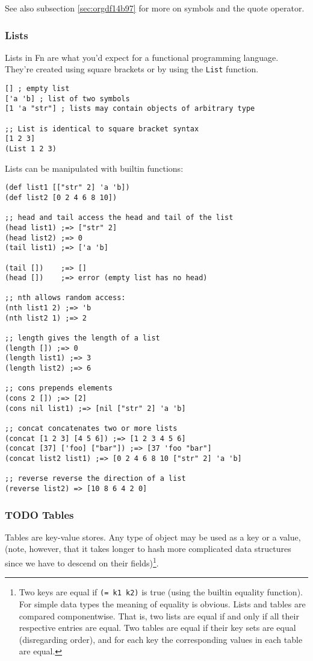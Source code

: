 \documentclass[11pt]{article}
\begin{document}
See also subsection \ref{sec:orgdf14b97} for more on symbols and the quote operator.


\subsubsection{Lists}
\label{sec:orga48c356}

Lists in Fn are what you'd expect for a functional programming language. They're
created using square brackets or by using the \texttt{List} function.

\begin{verbatim}
[] ; empty list
['a 'b] ; list of two symbols
[1 'a "str"] ; lists may contain objects of arbitrary type

;; List is identical to square bracket syntax
[1 2 3]
(List 1 2 3)
\end{verbatim}

Lists can be manipulated with builtin functions:

\begin{verbatim}
(def list1 [["str" 2] 'a 'b])
(def list2 [0 2 4 6 8 10])

;; head and tail access the head and tail of the list
(head list1) ;=> ["str" 2]
(head list2) ;=> 0
(tail list1) ;=> ['a 'b]

(tail [])    ;=> []
(head [])    ;=> error (empty list has no head)

;; nth allows random access:
(nth list1 2) ;=> 'b
(nth list2 1) ;=> 2

;; length gives the length of a list
(length []) ;=> 0
(length list1) ;=> 3
(length list2) ;=> 6

;; cons prepends elements
(cons 2 []) ;=> [2]
(cons nil list1) ;=> [nil ["str" 2] 'a 'b]

;; concat concatenates two or more lists
(concat [1 2 3] [4 5 6]) ;=> [1 2 3 4 5 6]
(concat [37] ['foo] ["bar"]) ;=> [37 'foo "bar"]
(concat list2 list1) ;=> [0 2 4 6 8 10 ["str" 2] 'a 'b]

;; reverse reverse the direction of a list
(reverse list2) => [10 8 6 4 2 0]
\end{verbatim}


\subsubsection{{\bfseries\sffamily TODO} Tables}
\label{sec:org4014214}

Tables are key-value stores. Any type of object may be used as a key or a value,
(note, however, that it takes longer to hash more complicated data structures
since we have to descend on their fields)\footnote{Two keys are equal if \texttt{(= k1 k2)} is true (using the builtin
equality function). For simple data types the meaning of equality is obvious.
Lists and tables are compared componentwise. That is, two lists are equal if and
only if all their respective entries are equal. Two tables are equal if their
key sets are equal (disregarding order), and for each key the corresponding
values in each table are equal.}.
\end{document}
